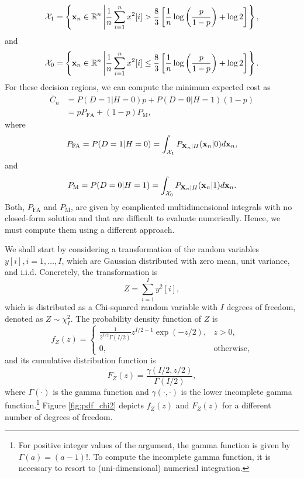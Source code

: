 \begin{equation*}
	{\cal X}_1 = \left\{{\mathbf x}_n \in \mathbb{R}^{n} \left| \frac{1}{n} \sum_{i = 1}^{n} x^2[i]  >  \frac{8}{3} \left[ \frac{1}{n}  \log \left(\frac{p}{1 - p}  \right) + \log 2 \right] \right. \right\},
\end{equation*}
and
\begin{equation*}
	{\cal X}_0 = \left\{{\mathbf x}_n \in \mathbb{R}^{n} \left| \frac{1}{n} \sum_{i = 1}^{n} x^2[i]  \leq \frac{8}{3} \left[ \frac{1}{n}  \log \left(\frac{p}{1 - p}  \right) + \log 2 \right] \right. \right\}.
\end{equation*}
For these decision regions, we can compute the minimum expected cost as
\begin{align*}
	\overline{C}_n &= P(D = 1 | H = 0) p +  P(D = 0 |H = 1) (1 - p) \\
	&= p P_{\text{FA}} + (1 - p) P_{\text{M}},
\end{align*}
where
\begin{equation*}
	P_{\text{FA}} = P(D = 1 | H = 0) = \int_{{\cal X}_1} P_{{\bf X}_n|H}({\bf x}_n|0) d {\bf x}_n,
\end{equation*}
and
\begin{equation*}
	P_{\text{M}} = P(D = 0 | H = 1) = \int_{{\cal X}_0} P_{{\bf X}_n|H}({\bf x}_n|1) d {\bf x}_n.
\end{equation*}
Both, $P_{\text{FA}}$ and $P_{\text{M}}$, are given by complicated multidimensional integrals with no closed-form solution and that are difficult to evaluate numerically. Hence, we must compute them using a different approach.

We shall start by considering a transformation of the random variables $y[i], i = 1, \ldots, I$, which are Gaussian distributed with zero mean, unit variance, and i.i.d. Concretely, the transformation is
\begin{equation*}
	Z = \sum_{i = 1}^{I} y^2[i],
\end{equation*}
which is distributed as a Chi-squared random variable with $I$ degrees of freedom, denoted as $Z \sim \chi^2_{I}$. The probability density function of $Z$ is
\begin{equation*}
	f_Z(z) = \begin{cases} \frac{1}{2^{I/2} \Gamma(I/2)} z^{I/2 - 1} \exp(-z/2), & z >0, \\ 0, & \text{otherwise,} \end{cases}
\end{equation*}
and its cumulative distribution function is
\begin{equation*}
	F_Z(z) = \frac{\gamma(I/2,z/2)}{\Gamma(I/2)},
\end{equation*}
where $\Gamma(\cdot)$ is the gamma function and $\gamma(\cdot,\cdot)$ is the lower incomplete gamma function.\footnote{For positive integer values of the argument, the gamma function is given by $\Gamma(a) = (a - 1)!$. To compute the incomplete gamma function, it is necessary to resort to (uni-dimensional) numerical integration.} Figure \ref{fig:pdf_chi2} depicts $f_Z(z)$ and $F_Z(z)$ for a different number of degrees of freedom.


